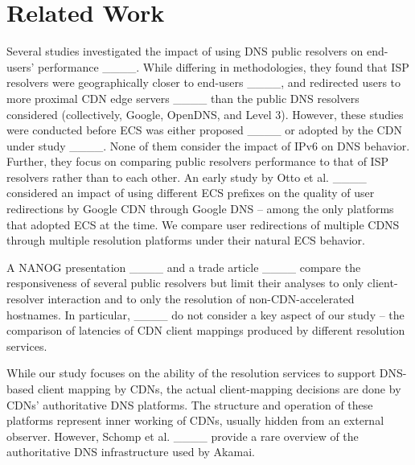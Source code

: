 \section{Related Work}
\label{sec:related}

Several studies investigated the impact of using DNS public resolvers on end-users' performance ____. 
While differing in methodologies, they found that ISP resolvers 
were geographically closer to end-users ____, 
and  redirected users to more proximal CDN edge servers ____ than the public DNS resolvers considered (collectively, Google, OpenDNS, and Level 3). However, these studies were conducted  before ECS was either proposed ____ or adopted by the CDN under study ____. None of them consider the impact of IPv6 on DNS behavior.  Further, they focus on comparing public resolvers performance to that of ISP resolvers rather than to each other. An early study by Otto et al. ____ considered an impact of using different ECS prefixes on the quality of user redirections by Google CDN through Google DNS -- among the only platforms that adopted ECS at the time.  We compare user redirections of multiple CDNS through multiple resolution platforms under their natural ECS behavior.

A NANOG presentation
____ and a trade article ____ compare the responsiveness of several public resolvers but limit their analyses to only client-resolver interaction and to only the resolution of non-CDN-accelerated hostnames.  In particular, ____ do not consider a key aspect of our study -- the comparison of latencies of CDN client mappings produced by different resolution services. 


While our study focuses on the ability of the resolution services to support DNS-based client mapping by CDNs, the actual client-mapping decisions are done by CDNs' authoritative DNS platforms. The structure and operation of these platforms represent inner working of CDNs, usually hidden from an external observer.  However, Schomp et al. ____ provide a rare overview of the authoritative DNS infrastructure used by Akamai.  

